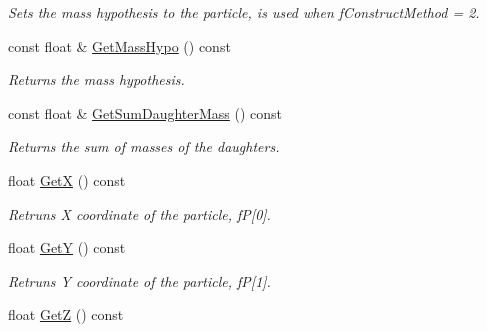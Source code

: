 \begin{DoxyCompactItemize}
\begin{DoxyCompactList}\small\item\em Sets the mass hypothesis to the particle, is used when f\+Construct\+Method = 2. \end{DoxyCompactList}\item 
const float \& \hyperlink{classKFParticleBase_a49908a949977d7311cb1eeba2c951742}{Get\+Mass\+Hypo} () const \hypertarget{classKFParticleBase_a49908a949977d7311cb1eeba2c951742}{}\label{classKFParticleBase_a49908a949977d7311cb1eeba2c951742}

\begin{DoxyCompactList}\small\item\em Returns the mass hypothesis. \end{DoxyCompactList}\item 
const float \& \hyperlink{classKFParticleBase_ad4582ede1b5ad12fdd57825458c7b316}{Get\+Sum\+Daughter\+Mass} () const \hypertarget{classKFParticleBase_ad4582ede1b5ad12fdd57825458c7b316}{}\label{classKFParticleBase_ad4582ede1b5ad12fdd57825458c7b316}

\begin{DoxyCompactList}\small\item\em Returns the sum of masses of the daughters. \end{DoxyCompactList}\item 
float \hyperlink{classKFParticleBase_afd445a88957351f077f9240a78725596}{GetX} () const \hypertarget{classKFParticleBase_afd445a88957351f077f9240a78725596}{}\label{classKFParticleBase_afd445a88957351f077f9240a78725596}

\begin{DoxyCompactList}\small\item\em Retruns X coordinate of the particle, fP\mbox{[}0\mbox{]}. \end{DoxyCompactList}\item 
float \hyperlink{classKFParticleBase_ae556c4dd7893cf3f30106488d643e724}{GetY} () const \hypertarget{classKFParticleBase_ae556c4dd7893cf3f30106488d643e724}{}\label{classKFParticleBase_ae556c4dd7893cf3f30106488d643e724}

\begin{DoxyCompactList}\small\item\em Retruns Y coordinate of the particle, fP\mbox{[}1\mbox{]}. \end{DoxyCompactList}\item 
float \hyperlink{classKFParticleBase_aa49c8625d2e60441842b7eefecfff20e}{GetZ} () const \hypertarget{classKFParticleBase_aa49c8625d2e60441842b7eefecfff20e}{}\label{classKFParticleBase_aa49c8625d2e60441842b7eefecfff20e}


\end{DoxyCompactItemize}
